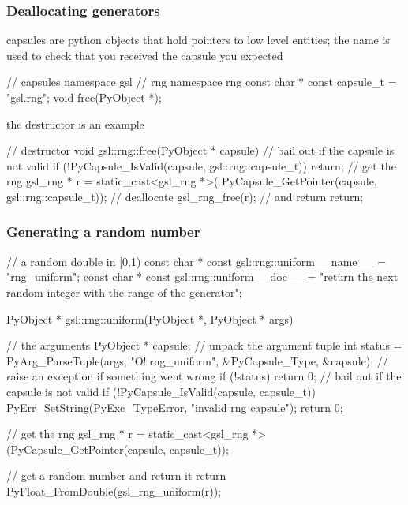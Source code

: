 \begin{frame}[fragile]
%
  \frametitle{Deallocating generators}
%
  capsules are python objects that hold pointers to low level entities; the name is used to
  check that you received the capsule you expected
%
  \begin{iC++}{}
// capsules
namespace gsl {
    // rng
    namespace rng {
        const char * const capsule_t = "gsl.rng"; 
        void free(PyObject *);
    }
}
  \end{iC++}
%
  the destructor is an example
%
  \begin{iC++}{}
// destructor
void gsl::rng::free(PyObject * capsule)
{
    // bail out if the capsule is not valid
    if (!PyCapsule_IsValid(capsule, gsl::rng::capsule_t)) return;
    // get the rng
    gsl_rng * r = static_cast<gsl_rng *>(
        PyCapsule_GetPointer(capsule, gsl::rng::capsule_t));
    // deallocate
    gsl_rng_free(r);
    // and return
    return;
}
  \end{iC++}
%
\end{frame}

\begin{frame}[fragile]
%
  \frametitle{Generating a random number}
%
  \begin{iC++}{}
// a random double in [0,1)
const char * const gsl::rng::uniform__name__ = "rng_uniform";
const char * const gsl::rng::uniform__doc__ = 
    "return the next random integer with the range of the generator";

PyObject * 
gsl::rng::uniform(PyObject *, PyObject * args) {
    // the arguments
    PyObject * capsule;
    // unpack the argument tuple
    int status = PyArg_ParseTuple(args, "O!:rng_uniform", &PyCapsule_Type, &capsule);
    // raise an exception if something went wrong
    if (!status) return 0;
    // bail out if the capsule is not valid
    if (!PyCapsule_IsValid(capsule, capsule_t)) {
        PyErr_SetString(PyExc_TypeError, "invalid rng capsule");
        return 0;
    }

    // get the rng
    gsl_rng * r = static_cast<gsl_rng *>(PyCapsule_GetPointer(capsule, capsule_t));

    // get a random number and return it
    return PyFloat_FromDouble(gsl_rng_uniform(r));
}
  \end{iC++}
%
\end{frame}

